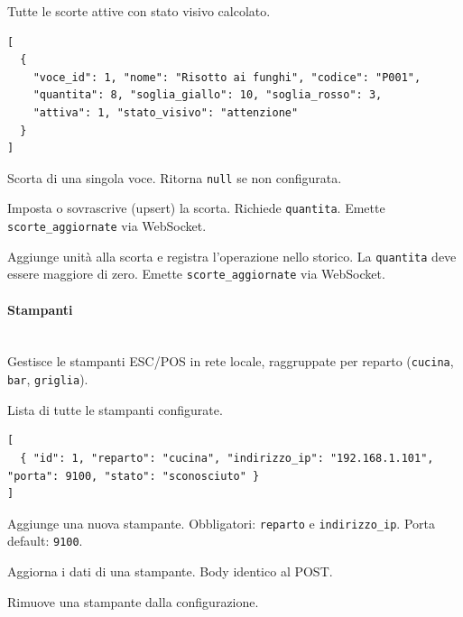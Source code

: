 Tutte le scorte attive con stato visivo calcolato.

\begin{lstlisting}[style=json]
[
  {
    "voce_id": 1, "nome": "Risotto ai funghi", "codice": "P001",
    "quantita": 8, "soglia_giallo": 10, "soglia_rosso": 3,
    "attiva": 1, "stato_visivo": "attenzione"
  }
]
\end{lstlisting}

Scorta di una singola voce. Ritorna \texttt{null} se non configurata.

Imposta o sovrascrive (upsert) la scorta. Richiede \texttt{quantita}. Emette \texttt{scorte\_aggiornate} via WebSocket.


Aggiunge unità alla scorta e registra l'operazione nello storico. La \texttt{quantita} deve essere maggiore di zero. Emette \texttt{scorte\_aggiornate} via WebSocket.


% 
\paragraph{Stampanti}\mbox{}\\
Gestisce le stampanti ESC/POS in rete locale, raggruppate per reparto (\texttt{cucina}, \texttt{bar}, \texttt{griglia}).

Lista di tutte le stampanti configurate.

\begin{lstlisting}[style=json]
[
  { "id": 1, "reparto": "cucina", "indirizzo_ip": "192.168.1.101", "porta": 9100, "stato": "sconosciuto" }
]
\end{lstlisting}

Aggiunge una nuova stampante. Obbligatori: \texttt{reparto} e \texttt{indirizzo\_ip}. Porta default: \texttt{9100}.


Aggiorna i dati di una stampante. Body identico al POST.


Rimuove una stampante dalla configurazione.

\newpage
